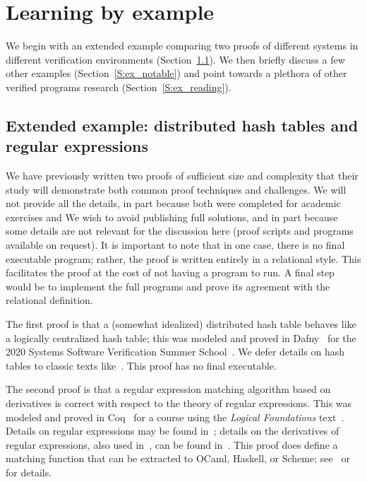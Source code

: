 \section{Learning by example}\label{S:examples}

We begin with an extended example comparing two proofs of different systems in
different verification environments (Section~\ref{S:ex_ext}). We then briefly
discuss a few other examples (Section~\ref{S:ex_notable}) and point towards a
plethora of other verified programs research (Section~\ref{S:ex_reading}).

\subsection{Extended example: distributed hash tables and regular
expressions}\label{S:ex_ext}

We have previously written two proofs of sufficient size and complexity that
their study will demonstrate both common proof techniques and challenges. We will
not provide all the details, in part because both were completed for academic
exercises and We wish to avoid publishing full solutions, and in part because
some details are not relevant for the discussion here (proof scripts and
programs available on request). It is important to note that in one case, there
is no final executable program; rather, the proof is written entirely in a
relational style. This facilitates the proof at the cost of not having a program
to run. A final step would be to implement the full programs and prove its
agreement with the relational definition.

The first proof is that a (somewhat idealized) distributed hash table behaves
like a logically centralized hash table; this was modeled and proved in
Dafny~\cite{leino2010dafny} for the 2020 Systems Software Verification Summer
School~\cite{Kapritsos_2020}. We defer details on hash tables to classic texts
like~\cite{CLRS}. This proof has no final executable.

The second proof is that a regular expression matching algorithm based on
derivatives is correct with respect to the theory of regular expressions. This
was modeled and proved in Coq~\cite{Coq} for a course using the \emph{Logical
Foundations} text~\cite{Pierce:SF1}. Details on regular expressions may be found
in~\cite{Lewis_1997,Morrisett_2012}; details on the derivatives of regular
expressions, also used in~\cite{Pierce:SF1,Morrisett_2012}, can be found
in~\cite{Might_Yacc,Might_desugar,Might_deriv}. This proof does define a
matching function that can be extracted to OCaml, Haskell, or Scheme;
see~\cite{Coq_Extract} or~\cite[Extraction]{Pierce:SF1} for details.

